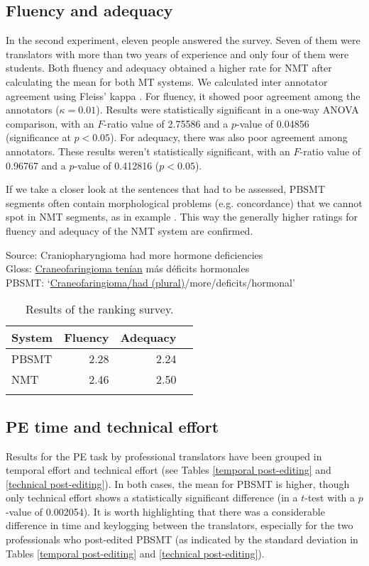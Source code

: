 \documentclass[output=paper]{langsci/langscibook}
\begin{document}
\subsection{Fluency and adequacy}
In the second experiment, eleven people answered the survey. Seven of them were translators with more than two years of experience and only four of them were students. Both fluency and adequacy obtained a higher rate for NMT after calculating the mean for both MT systems. We calculated inter annotator agreement using Fleiss' kappa \citep{fleiss1971}. For fluency, it showed poor agreement among the annotators ($\kappa=0.01$). Results were statistically significant in a one-way ANOVA comparison, with an $F$-ratio value of 2.75586 and a $p$-value of 0.04856 (significance at $p<0.05$). For adequacy, there was also poor agreement among annotators. These results weren't statistically significant, with an $F$-ratio value of 0.96767 and a $p$-value of 0.412816 ($p<0.05$). 

If we take a closer look at the sentences that had to be assessed, PBSMT segments often contain morphological problems (e.g. concordance) that we cannot spot in NMT segments, as in example . This way the generally higher ratings for fluency and adequacy of the NMT system are confirmed. 



\ea\label{example1}
\gll Source: Craniopharyngioma had more hormone deficiencies\\
Gloss: \underline{Craneofaringioma tenían} más déficits hormonales\\
\glt PBSMT: `\underline{Craneofaringioma/had (plural)}/more/deficits/hormonal'
\z

\begin{table}
\begin{tabularx}{.66\textwidth}{Xrrr}
\lsptoprule
{System} & {Fluency} & {Adequacy}\\
\midrule
PBSMT & 2.28 & 2.24 \\
NMT & 2.46 & 2.50 \\
\lspbottomrule
\end{tabularx}
\caption{\label{eval-mteval1reference2}Results of the ranking survey.}
\end{table}

\subsection{PE time and technical effort}
Results for the PE task by professional translators have been grouped in temporal effort and technical effort (see Tables \ref{temporal post-editing} and \ref{technical post-editing}). In both cases, the mean for PBSMT is higher, though only technical effort shows a statistically significant difference (in a $t$-test with a $p$-value of 0.002054). It is worth highlighting that there was a considerable difference in time and keylogging between the translators, especially for the two professionals who post-edited PBSMT (as indicated by the standard deviation in Tables \ref{temporal post-editing} and \ref{technical post-editing}).
\end{document}
